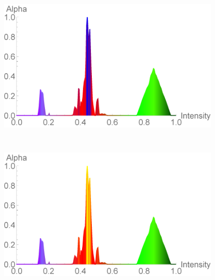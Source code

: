 \documentclass[twoside,twocolumn,10pt]{article}
\begin{document}
\begin{figure}
\begin{minipage}{.2\textwidth}
		\label{fig:nucleon_2_yellow}
	\end{minipage}
	\begin{minipage}{.24\textwidth}
		\centering
		\includegraphics[width=1\linewidth]{tf_nucleon_2_blue}
		\label{fig:tf_nucleon_2_blue}
	\end{minipage}~
	\begin{minipage}{.24\textwidth}
		\centering
		\includegraphics[width=1\linewidth]{tf_nucleon_2_yellow}
		\label{fig:tf_nucleon_2_yellow}
	\end{minipage}

\end{figure}
\end{document}
